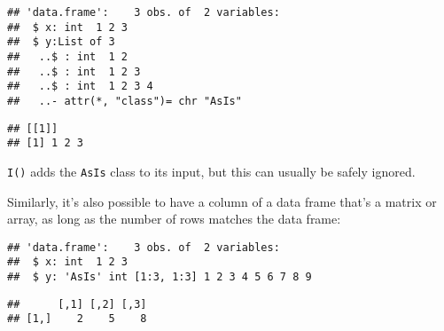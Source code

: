 \begin{verbatim}
## 'data.frame':    3 obs. of  2 variables:
##  $ x: int  1 2 3
##  $ y:List of 3
##   ..$ : int  1 2
##   ..$ : int  1 2 3
##   ..$ : int  1 2 3 4
##   ..- attr(*, "class")= chr "AsIs"
\end{verbatim}

\begin{Shaded}
\begin{Highlighting}[]
\NormalTok{dfl[}\NormalTok{, }\NormalTok{]}
\end{Highlighting}
\end{Shaded}

\begin{verbatim}
## [[1]]
## [1] 1 2 3
\end{verbatim}

\texttt{I()} adds the \texttt{AsIs} class to its input, but this can
usually be safely ignored. 

Similarly, it's also possible to have a column of a data frame that's a
matrix or array, as long as the number of rows matches the data frame:

\begin{Shaded}
\begin{Highlighting}[]
\StringTok{ }\NormalTok{(} \OperatorTok{:}\NormalTok{, } \NormalTok{(}\NormalTok{(}\OperatorTok{:}\NormalTok{, } \NormalTok{)))}
\end{Highlighting}
\end{Shaded}

\begin{verbatim}
## 'data.frame':    3 obs. of  2 variables:
##  $ x: int  1 2 3
##  $ y: 'AsIs' int [1:3, 1:3] 1 2 3 4 5 6 7 8 9
\end{verbatim}

\begin{Shaded}
\begin{Highlighting}[]
\NormalTok{dfm[}\NormalTok{, }\NormalTok{]}
\end{Highlighting}
\end{Shaded}

\begin{verbatim}
##      [,1] [,2] [,3]
## [1,]    2    5    8
\end{verbatim}


